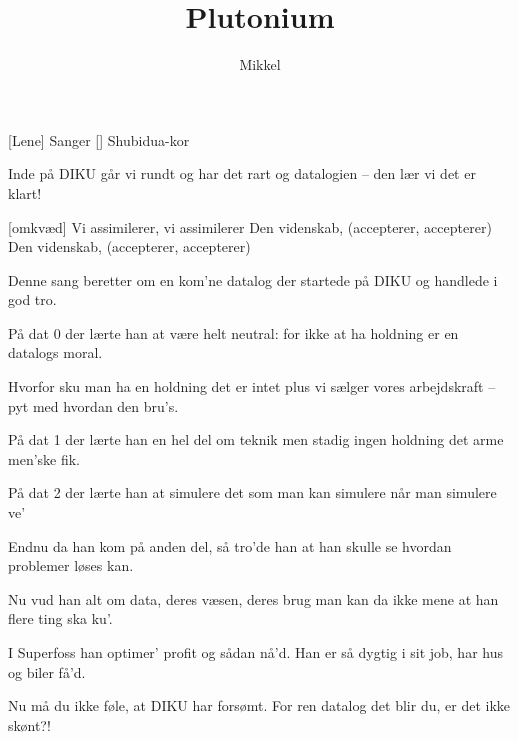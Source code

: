 \documentclass[a4paper,11pt]{article}
\title{Plutonium}
\author{Mikkel}
\begin{document}
\maketitle

\begin{roles}
[Lene] Sanger
[] Shubidua-kor
\end{roles}


\begin{song}
%
Inde på DIKU går vi rundt og har det rart
og datalogien -- den lær vi det er klart!

[omkvæd]
Vi assimilerer, vi assimilerer
Den videnskab, (accepterer, accepterer)
Den videnskab, (accepterer, accepterer)

%
Denne sang beretter om en kom'ne datalog
der startede på DIKU og handlede i god tro.

På dat 0 der lærte han at være helt neutral:
for ikke at ha holdning er en datalogs moral.

Hvorfor sku man ha en holdning det er intet plus
vi sælger vores arbejdskraft -- pyt med hvordan den bru's.

På dat 1 der lærte han en hel del om teknik
men stadig ingen holdning det arme men'ske fik.

På dat 2 der lærte han at simulere det
som man kan simulere når man simulere ve'

Endnu da han kom på anden del, så tro'de han
at han skulle se hvordan problemer løses kan.

Nu vud han alt om data, deres væsen, deres brug
man kan da ikke mene at han flere ting ska ku'.

I Superfoss han optimer' profit og sådan nå'd.
Han er så dygtig i sit job, har hus og biler få'd.

Nu må du ikke føle, at DIKU har forsømt.
For ren datalog det blir du, er det ikke skønt?!
\end{song}
\end{document}
